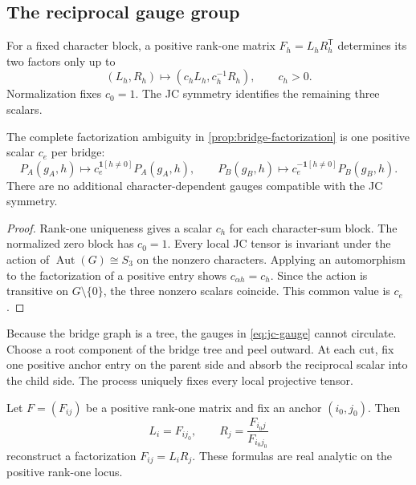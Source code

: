 

\subsection{The reciprocal gauge group}

For a fixed character block, a positive rank-one matrix $F_h=L_hR_h^{\mathsf T}$ determines its two factors only up to
\[
(L_h,R_h)\longmapsto(c_hL_h,c_h^{-1}R_h),\qquad c_h>0.
\]
Normalization fixes $c_0=1$.  The JC symmetry identifies the remaining three scalars.

\begin{lemma}\label{lem:bridge-gauge}
The complete factorization ambiguity in \cref{prop:bridge-factorization} is one positive scalar $c_e$ per bridge:
\begin{equation}\label{eq:jc-gauge}
P_A(g_A,h)\longmapsto c_e^{\mathbf1[h\ne0]}P_A(g_A,h),
\qquad
P_B(g_B,h)\longmapsto c_e^{-\mathbf1[h\ne0]}P_B(g_B,h).
\end{equation}
There are no additional character-dependent gauges compatible with the JC symmetry.
\end{lemma}

\begin{proof}
Rank-one uniqueness gives a scalar $c_h$ for each character-sum block.  The normalized zero block has $c_0=1$.  Every local JC tensor is invariant under the action of $\operatorname{Aut}(G)\cong S_3$ on the nonzero characters.  Applying an automorphism to the factorization of a positive entry shows $c_{\alpha h}=c_h$.  Since the action is transitive on $G\setminus\{0\}$, the three nonzero scalars coincide.  This common value is $c_e$.
\end{proof}

Because the bridge graph is a tree, the gauges in \eqref{eq:jc-gauge} cannot circulate.  Choose a root component of the bridge tree and peel outward.  At each cut, fix one positive anchor entry on the parent side and absorb the reciprocal scalar into the child side.  The process uniquely fixes every local projective tensor.

\begin{lemma}\label{lem:anchor}
Let $F=(F_{ij})$ be a positive rank-one matrix and fix an anchor $(i_0,j_0)$.  Then
\[
L_i=F_{i j_0},
\qquad
R_j=\frac{F_{i_0j}}{F_{i_0j_0}}
\]
reconstruct a factorization $F_{ij}=L_iR_j$.  These formulas are real analytic on the positive rank-one locus.
\end{lemma}

